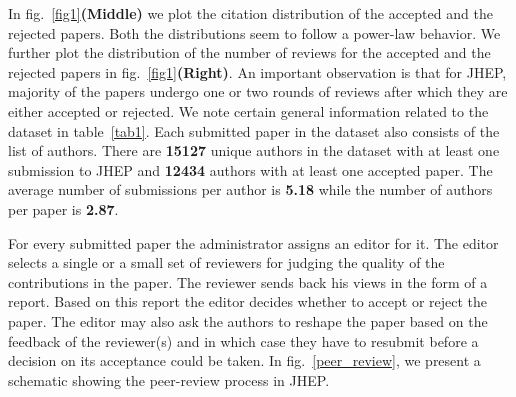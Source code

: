 In fig.~\ref{fig1}{\bf(Middle)} we plot the citation distribution of the accepted and the rejected papers. Both the distributions seem to follow a power-law behavior. We further plot 
the distribution of the number of reviews for the accepted and the rejected papers in fig.~\ref{fig1}{\bf(Right)}. An important observation is that for JHEP, majority of the 
papers undergo one or two rounds of reviews after which they are either accepted or rejected. 
We note certain general information related to the dataset in table~\ref{tab1}.
Each submitted paper in the dataset also consists of the list of authors. There are {\bf 15127} unique authors in the dataset with at least one submission to JHEP and {\bf 12434} authors with at least one accepted paper. The average number of submissions per author is {\bf 5.18} while the number of authors per paper is {\bf 2.87}. 

 For every submitted paper the administrator assigns an editor for it. The editor selects a single or a small set of reviewers for judging the quality of the contributions in the paper. The reviewer sends back his views in the form of a report. Based on this report the editor decides whether to accept or reject the paper. The editor may also ask the authors to reshape the paper based on the feedback of the reviewer(s) and in which case they have to resubmit before a decision on its acceptance could be taken. In fig.~\ref{peer_review}, we present a schematic showing the peer-review process in JHEP.

\medskip